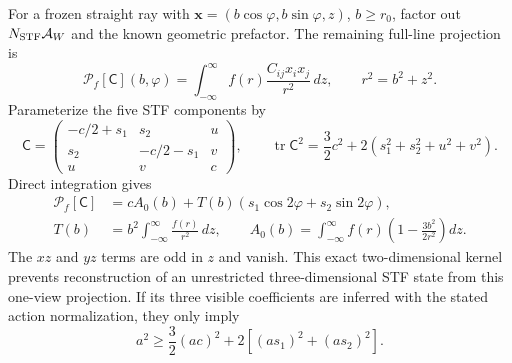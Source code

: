 For a frozen straight ray with $\mathbf x=(b\cos\varphi,b\sin\varphi,z)$, $b\ge r_0$, factor out $N_{\rm STF}\mathcal A_W$ and the known geometric prefactor. The remaining full-line projection is
\begin{equation}
 \mathcal P_f[\mathsf C](b,\varphi)
 =\int_{-\infty}^{\infty} f(r)\frac{C_{ij}x_i x_j}{r^2}\,dz,
 \qquad r^2=b^2+z^2.
\end{equation}
Parameterize the five STF components by
\begin{equation}
 \mathsf C=\begin{pmatrix}
 -c/2+s_1&s_2&u\\ s_2&-c/2-s_1&v\\ u&v&c
 \end{pmatrix},\qquad
 \operatorname{tr}\mathsf C^2=\frac32c^2+2(s_1^2+s_2^2+u^2+v^2).
\end{equation}
Direct integration gives
\begin{align}
 \mathcal P_f[\mathsf C]&=cA_0(b)
 +T(b)(s_1\cos2\varphi+s_2\sin2\varphi),\label{eq:stf-projection}\\
 T(b)&=b^2\int_{-\infty}^{\infty}\frac{f(r)}{r^2}\,dz,\qquad
 A_0(b)=\int_{-\infty}^{\infty}f(r)
 \left(1-\frac{3b^2}{2r^2}\right)dz.\label{eq:radial-projections}
\end{align}
The $xz$ and $yz$ terms are odd in $z$ and vanish. This exact two-dimensional kernel prevents reconstruction of an unrestricted three-dimensional STF state from this one-view projection. If its three visible coefficients are inferred with the stated action normalization, they only imply
\begin{equation}
 a^2\ge\frac32(ac)^2+2[(as_1)^2+(as_2)^2].
\end{equation}

